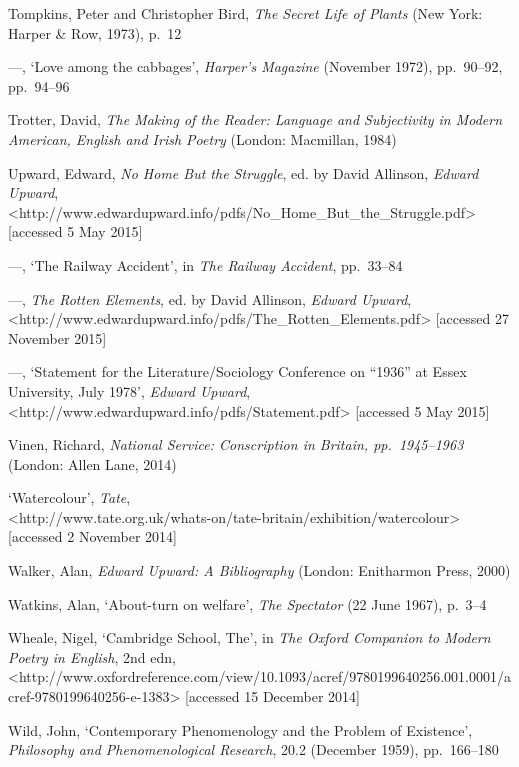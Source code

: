 \documentclass[]{article}
\begin{document}
Tompkins, Peter and Christopher Bird, \emph{The Secret Life of Plants}
(New York: Harper \& Row, 1973), p.~12

—, ‘Love among the cabbages’, \emph{Harper’s Magazine} (November 1972),
pp.~90–92, pp.~94–96

Trotter, David, \emph{The Making of the Reader: Language and
Subjectivity in Modern American, English and Irish Poetry} (London:
Macmillan, 1984)

Upward, Edward, \emph{No Home But the Struggle}, ed. by David Allinson,
\emph{Edward Upward},\\
\textless{}http://www.edwardupward.info/pdfs/No\_Home\_But\_the\_Struggle.pdf\textgreater{}
{[}accessed 5 May 2015{]}

—, ‘The Railway Accident’, in \emph{The Railway Accident}, pp.~33–84

—, \emph{The Rotten Elements}, ed. by David Allinson, \emph{Edward
Upward},\\
\textless{}http://www.edwardupward.info/pdfs/The\_Rotten\_Elements.pdf\textgreater{}
{[}accessed 27 November 2015{]}

—, ‘Statement for the Literature/Sociology Conference on “1936” at Essex
University, July 1978’, \emph{Edward Upward},\\
\textless{}http://www.edwardupward.info/pdfs/Statement.pdf\textgreater{}
{[}accessed 5 May 2015{]}

Vinen, Richard, \emph{National Service: Conscription in Britain,
pp.~1945–1963} (London: Allen Lane, 2014)

‘Watercolour’, \emph{Tate},\\
\textless{}http://www.tate.org.uk/whats-on/tate-britain/exhibition/watercolour\textgreater{}
{[}accessed 2 November 2014{]}

Walker, Alan, \emph{Edward Upward: A Bibliography} (London: Enitharmon
Press, 2000)

Watkins, Alan, ‘About-turn on welfare’, \emph{The Spectator} (22 June
1967), p.~3–4

Wheale, Nigel, ‘Cambridge School, The’, in \emph{The Oxford Companion to
Modern Poetry in English}, 2nd edn,\\
\textless{}http://www.oxfordreference.com/view/10.1093/acref/9780199640256.001.0001/acref-9780199640256-e-1383\textgreater{}
{[}accessed 15 December 2014{]}

Wild, John, ‘Contemporary Phenomenology and the Problem of Existence’,
\emph{Philosophy and Phenomenological Research}, 20.2 (December 1959),
pp.~166–180
\end{document}
